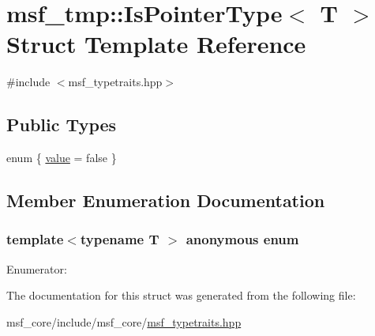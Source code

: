 \hypertarget{structmsf__tmp_1_1IsPointerType}{\section{msf\-\_\-tmp\-:\-:Is\-Pointer\-Type$<$ T $>$ Struct Template Reference}
\label{structmsf__tmp_1_1IsPointerType}
}


{\ttfamily \#include $<$msf\-\_\-typetraits.\-hpp$>$}

\subsection*{Public Types}
\begin{DoxyCompactItemize}
\item 
enum \{ \hyperlink{structmsf__tmp_1_1IsPointerType_a4ea953e50962ebf60bec8f1f5382ef11a34819f8f95b78509ba8558fc7f742db3}{value} =  false
 \}
\end{DoxyCompactItemize}


\subsection{Member Enumeration Documentation}
\hypertarget{structmsf__tmp_1_1IsPointerType_a4ea953e50962ebf60bec8f1f5382ef11}{\subsubsection[{anonymous enum}]{\setlength{\rightskip}{0pt plus 5cm}template$<$typename T $>$ anonymous enum}}\label{structmsf__tmp_1_1IsPointerType_a4ea953e50962ebf60bec8f1f5382ef11}
\begin{Desc}
\item[Enumerator\-: ]\par
\begin{description}
\item[{\em 
\hypertarget{structmsf__tmp_1_1IsPointerType_a4ea953e50962ebf60bec8f1f5382ef11a34819f8f95b78509ba8558fc7f742db3}{value}\label{structmsf__tmp_1_1IsPointerType_a4ea953e50962ebf60bec8f1f5382ef11a34819f8f95b78509ba8558fc7f742db3}
}]\end{description}
\end{Desc}



The documentation for this struct was generated from the following file\-:\begin{DoxyCompactItemize}
\item 
msf\-\_\-core/include/msf\-\_\-core/\hyperlink{msf__typetraits_8hpp}{msf\-\_\-typetraits.\-hpp}\end{DoxyCompactItemize}
